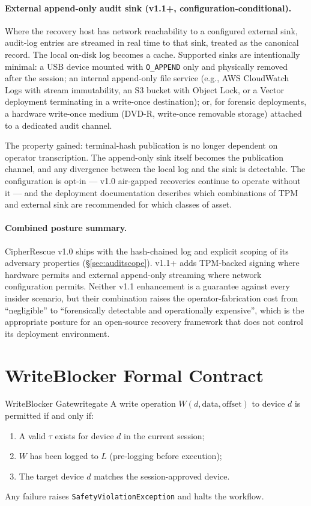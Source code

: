 \documentclass[11pt,a4paper]{report}
\begin{document}
\paragraph{External append-only audit sink (v1.1+, configuration-conditional).}
Where the recovery host has network reachability to a configured external sink, audit-log entries are streamed in real time to that sink, treated as the canonical record. The local on-disk log becomes a cache. Supported sinks are intentionally minimal: a USB device mounted with \texttt{O\_APPEND} only and physically removed after the session; an internal append-only file service (e.g., AWS CloudWatch Logs with stream immutability, an S3 bucket with Object Lock, or a Vector deployment terminating in a write-once destination); or, for forensic deployments, a hardware write-once medium (DVD-R, write-once removable storage) attached to a dedicated audit channel.

The property gained: terminal-hash publication is no longer dependent on operator transcription. The append-only sink itself becomes the publication channel, and any divergence between the local log and the sink is detectable. The configuration is opt-in --- v1.0 air-gapped recoveries continue to operate without it --- and the deployment documentation describes which combinations of TPM and external sink are recommended for which classes of asset.

\paragraph{Combined posture summary.} CipherRescue v1.0 ships with the hash-chained log and explicit scoping of its adversary properties (\S\ref{sec:auditscope}). v1.1+ adds TPM-backed signing where hardware permits and external append-only streaming where network configuration permits. Neither v1.1 enhancement is a guarantee against every insider scenario, but their combination raises the operator-fabrication cost from ``negligible'' to ``forensically detectable and operationally expensive'', which is the appropriate posture for an open-source recovery framework that does not control its deployment environment.

\section{WriteBlocker Formal Contract}

\begin{definition}{WriteBlocker Gate}{writegate}
A write operation $W(d, \text{data}, \text{offset})$ to device $d$ is permitted if and only if:
\begin{enumerate}[label=(\roman*)]
  \item A valid $\tau$ exists for device $d$ in the current session;
  \item $W$ has been logged to $L$ (pre-logging before execution);
  \item The target device $d$ matches the session-approved device.
\end{enumerate}
Any failure raises \texttt{SafetyViolationException} and halts the workflow.
\end{definition}
\end{document}
